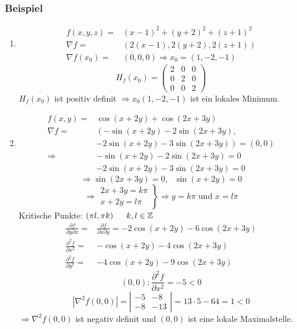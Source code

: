 \subsubsection*{Beispiel}
\begin{enumerate}
\item \begin{align*}
f\left( x,y,z\right)= & \left(x-1\right)^2+\left(y+2\right)^2+\left(z+1\right)^2\\
\nabla f= & \left( 2\left(x-1\right),2\left(y+2\right),2\left(z+1\right)\right)\\
\nabla f\left( x_0\right)=&\left( 0,0,0\right)\Rightarrow x_0=\left( 1,-2,-1\right)
\end{align*}
\[{H_f}\left( {{x_0}} \right) = \left( {\begin{array}{*{20}{c}}
2&0&0\\
0&2&0\\
0&0&2
\end{array}} \right)\]
$H_f\left( x_0\right)$ ist positiv definit $\Rightarrow x_0\left( 1,-2,-1\right)$ ist ein lokales Minimum.
\item \begin{align*}
f\left( x,y\right)= & \cos\left(x+2y\right)+\cos\left(2x+3y\right)\\
\nabla f= & \left( -\sin\left(x+2y\right)-2\sin\left( 2x +3y\right)\right.,\\
&\left.-2\sin\left(x+2y\right)-3\sin\left(2x+3y\right)\right)=\left( 0,0\right)\\
\Rightarrow &-\sin\left( x+2y\right)-2\sin\left( 2x+3y\right)=0\\
&-2\sin\left( x+2y\right)-3\sin\left( 2x+3y\right)=0
\end{align*}
\[\Rightarrow \sin\left( 2x+3y\right) = 0,\text{ }\sin\left( x+2y\right)=0\]
\[ \Rightarrow \left. {\begin{array}{*{20}{r}}
{2x + 3y = k\pi }\\
{x + 2y = l\pi }
\end{array}} \right\} \Rightarrow y = k\pi {\text{ und }}x = l\pi \]
Kritische Punkte: $\left( \pi l,\pi k\right)\hspace{5mm}k,l\in\mathbb{Z}$
\begin{align*}
\frac{{\partial f}}{{\partial y\partial x}} =&\frac{{\partial f}}{{\partial x\partial y}} =  - 2\cos \left( {x + 2y} \right) - 6\cos \left( {2x + 3y} \right)\\
\frac{{{\partial ^2}f}}{{\partial {x^2}}} =&- \cos \left( {x + 2y} \right) - 4\cos \left( {2x + 3y} \right)\\
\frac{{{\partial ^2}f}}{{\partial {y^2}}} =&- 4\cos \left( {x + 2y} \right) - 9\cos \left( {2x + 3y} \right)
\end{align*}
\[\left( 0,0\right):\frac{{{\partial ^2}f}}{{\partial {x^2}}}=-5<0\]
\[\left| {{\nabla ^2}f\left( {0,0} \right)} \right| = \left| {\begin{array}{*{20}{c}}
{ - 5}&{ - 8}\\
{ - 8}&{ - 13}
\end{array}} \right| = 13 \cdot 5 - 64 = 1 < 0\]
$\Rightarrow\nabla^2 f\left( 0,0\right)$ ist negativ definit und $\left( 0,0\right)$ ist eine lokale Maximalstelle.\\


\end{enumerate}
